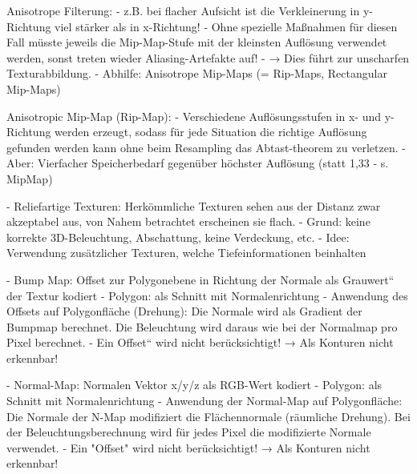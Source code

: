 \documentclass[10pt,landscape]{article}
\makeatletter
\renewcommand{\subsection}{\@startsection{subsection}{2}{0mm}%
                                {-1explus -.5ex minus -.2ex}%
                                {0.5ex plus .2ex}%
                                {\normalfont\normalsize\bfseries}}
\makeatother
\begin{document}
\begin{multicols}{3}
Anisotrope Filterung: 
- z.B. bei flacher Aufsicht ist die Verkleinerung in y-Richtung viel stärker als in x-Richtung!
- Ohne spezielle Maßnahmen für diesen Fall müsste jeweils die Mip-Map-Stufe mit der kleinsten Auflösung verwendet werden, sonst treten wieder Aliasing-Artefakte auf! 
- → Dies führt zur unscharfen Texturabbildung.
- Abhilfe: Anisotrope Mip-Maps (= Rip-Maps, Rectangular Mip-Maps)

Anisotropic Mip-Map (Rip-Map):
- Verschiedene Auflösungsstufen in x- und y-Richtung werden erzeugt, sodass für jede Situation die richtige Auflösung gefunden werden kann ohne beim Resampling das Abtast-theorem zu verletzen.
- Aber: Vierfacher Speicherbedarf gegenüber höchster Auflösung (statt 1,33 - s. MipMap)


- Reliefartige Texturen: Herkömmliche Texturen sehen aus der Distanz zwar akzeptabel aus, von Nahem betrachtet erscheinen sie flach.
- Grund: keine korrekte 3D-Beleuchtung, Abschattung, keine Verdeckung, etc.
- Idee: Verwendung zusätzlicher Texturen, welche Tiefeinformationen beinhalten

- Bump Map: Offset zur Polygonebene in Richtung der Normale als Grauwert“ der Textur kodiert
- Polygon: als Schnitt mit Normalenrichtung
- Anwendung des Offsets auf Polygonfläche (Drehung): Die Normale wird als Gradient der Bumpmap berechnet. Die Beleuchtung wird daraus wie bei der Normalmap pro Pixel berechnet.
- Ein Offset“ wird nicht berücksichtigt! → Als Konturen nicht erkennbar!


- Normal-Map: Normalen Vektor x/y/z als RGB-Wert kodiert
- Polygon: als Schnitt mit Normalenrichtung
- Anwendung der Normal-Map auf Polygonfläche: Die Normale der N-Map modifiziert die Flächennormale (räumliche Drehung). Bei der Beleuchtungsberechnung wird für jedes Pixel die modifizierte Normale verwendet.
- Ein "Offset" wird nicht berücksichtigt! → Als Konturen nicht erkennbar!


\end{multicols}
\end{document}
